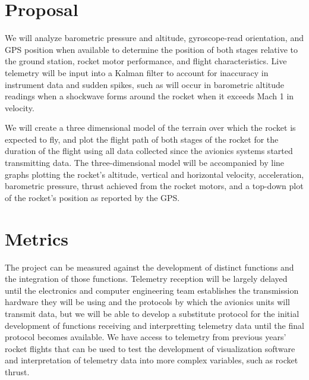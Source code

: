 \documentclass[10pt,draftclsnofoot,onecolumn]{article}
\begin{document}
\section{Proposal}

We will analyze barometric pressure and altitude, gyroscope-read orientation, and GPS position when available to determine the position of both stages relative to the ground station, rocket motor performance, and flight characteristics. Live telemetry will be input into a Kalman filter to account for inaccuracy in instrument data and sudden spikes, such as will occur in barometric altitude readings when a shockwave forms around the rocket when it exceeds Mach 1 in velocity.

We will create a three dimensional model of the terrain over which the rocket is expected to fly, and plot the flight path of both stages of the rocket for the duration of the flight using all data collected since the avionics systems started transmitting data. The three-dimensional model will be accompanied by line graphs plotting the rocket's altitude, vertical and horizontal velocity, acceleration, barometric pressure, thrust achieved from the rocket motors, and a top-down plot of the rocket's position as reported by the GPS.

\section{Metrics}
The project can be measured against the development of distinct functions and the integration of those functions. Telemetry reception will be largely delayed until the electronics and computer engineering team establishes the transmission hardware they will be using and the protocols by which the avionics units will transmit data, but we will be able to develop a substitute protocol for the initial development of functions receiving and interpretting telemetry data until the final protocol becomes available. We have access to telemetry from previous years' rocket flights that can be used to test the development of visualization software and interpretation of telemetry data into more complex variables, such as rocket thrust.
\end{document}
